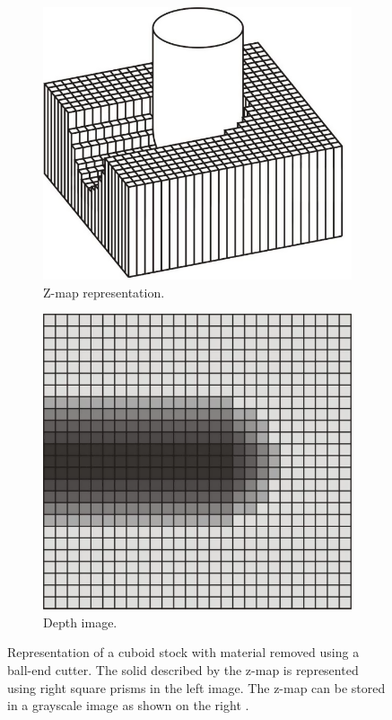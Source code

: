 \begin{description}
	\begin{figure}[H]
		\centering
		\begin{subfigure}[b]{0.4\textwidth}
			\centering
			\includegraphics[width=\textwidth]{images/zmap}
			\caption{Z-map representation.}
			\label{fig:zmap}
		\end{subfigure}
		\begin{subfigure}[b]{0.4\textwidth}
			\centering
			\includegraphics[width=\textwidth]{images/depth_image}
			\caption{Depth image.}
			\label{fig:depth_image}
		\end{subfigure}
		\caption[Z-map and depth image]{
			Representation of a cuboid stock with material removed using a ball-end cutter.
			The solid described by the z-map is represented using right square prisms in the left image.
			The z-map can be stored in a grayscale image as shown on the right  \cite{virtual_machining_review}.
		}
	\end{figure}



\end{description}
